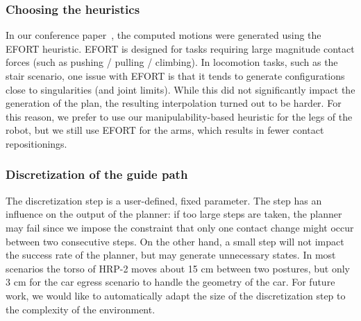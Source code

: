 \subsubsection{Choosing the heuristics} \label{sec:heuristichoices}
In our conference paper~\citep{tonneauisrr15}, the computed motions were generated using the EFORT heuristic.
EFORT is designed for tasks requiring large magnitude contact forces (such as pushing / pulling / climbing). 
In locomotion tasks, such as the stair scenario, one issue with EFORT is that it tends to generate
configurations close to singularities (and joint limits). While this did not significantly impact
the generation of the plan, the resulting interpolation turned out to be harder.
For this reason, we prefer to use our manipulability-based heuristic for the legs of the robot, but we still
use EFORT for the arms, which results in fewer contact repositionings.


\subsubsection{Discretization of the guide path} \label{sec:disc}
The discretization step is a user-defined, fixed parameter. The step
has an influence on the output of the planner: if too large steps are taken,
the planner may fail since we impose the constraint that only one contact change might occur
between two consecutive steps. On the other hand, a small step will not impact the success rate of the planner, 
but may generate unnecessary states. In most scenarios the torso of HRP-2 moves about 15 cm between two postures, but only 3 cm
for the car egress scenario to handle the geometry of the car.
For future work, we would like to automatically adapt the size of the discretization step to the complexity of the environment.

